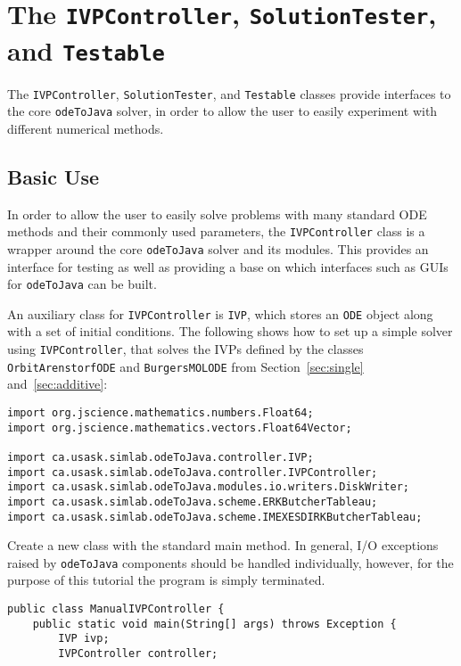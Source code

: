 \documentclass[10pt,letterpaper]{article}
\newcommand\odj{{\tt odeToJava}}
\newcommand\ode{{\tt ODE}}
\newcommand\ivp{{\tt IVP}}
\newcommand\ivpcont{{\tt IVPController}}
\newcommand\tstble{{\tt Testable}}
\newcommand\stster{{\tt SolutionTester}}
\begin{document}
\section{The \ivpcont, \stster, and \tstble{}}

The \ivpcont, \stster, and \tstble{} classes provide interfaces to the core
\odj{} solver, in order to allow the user to easily experiment with different
numerical methods.

\subsection{Basic Use}\label{sec:basic}

In order to allow the user to easily solve problems with many standard ODE
methods and their commonly used parameters, the \ivpcont{} class is a
wrapper around the core \odj{} solver and its modules. This provides an interface for
testing as well as providing a base on which interfaces such as GUIs for \odj{}
can be built.

An auxiliary class for \ivpcont{} is \ivp{}, which stores an \ode{} object along
with a set of initial conditions. The following shows how to set up a simple
solver using {\tt IVPController}, that solves the IVPs defined by the classes
{\tt OrbitArenstorfODE} and {\tt BurgersMOLODE} from Section~\ref{sec:single}
and~\ref{sec:additive}:

\begin{lstlisting}
import org.jscience.mathematics.numbers.Float64;
import org.jscience.mathematics.vectors.Float64Vector;

import ca.usask.simlab.odeToJava.controller.IVP;
import ca.usask.simlab.odeToJava.controller.IVPController;
import ca.usask.simlab.odeToJava.modules.io.writers.DiskWriter;
import ca.usask.simlab.odeToJava.scheme.ERKButcherTableau;
import ca.usask.simlab.odeToJava.scheme.IMEXESDIRKButcherTableau;
\end{lstlisting}

Create a new class with the standard main method. In general, I/O exceptions
raised by \odj{} components should be handled individually, however, for the
purpose of this tutorial the program is simply terminated.

\begin{lstlisting}
public class ManualIVPController {
    public static void main(String[] args) throws Exception {
        IVP ivp;
        IVPController controller;
\end{lstlisting}
\end{document}
